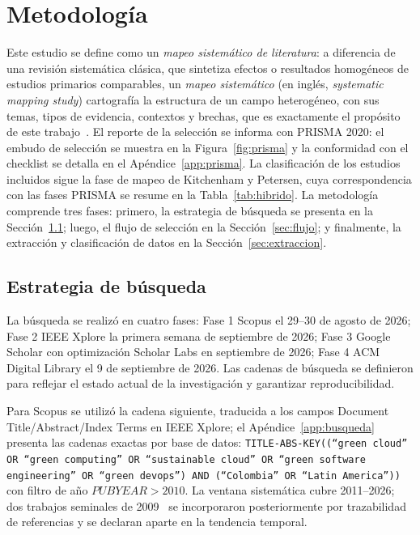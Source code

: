 \documentclass[conference]{IEEEtran}
\begin{document}
\section{Metodolog\'ia}\label{sec:met}
Este estudio se define como un \emph{mapeo sistem\'atico de literatura}: a diferencia de una revisi\'on sistem\'atica cl\'asica, que sintetiza efectos o resultados homog\'eneos de estudios primarios comparables, un \emph{mapeo sistem\'atico} (en ingl\'es, \emph{systematic mapping study}) cartograf\'ia la estructura de un campo heterog\'eneo, con sus temas, tipos de evidencia, contextos y brechas, que es exactamente el prop\'osito de este trabajo~\cite{kitchenham2007,petersen2015}. El reporte de la selecci\'on se informa con PRISMA 2020: el embudo de selecci\'on se muestra en la Figura~\ref{fig:prisma} y la conformidad con el checklist se detalla en el Ap\'endice~\ref{app:prisma}. La clasificaci\'on de los estudios incluidos sigue la fase de mapeo de Kitchenham y Petersen, cuya correspondencia con las fases PRISMA se resume en la Tabla~\ref{tab:hibrido}. La metodolog\'ia comprende tres fases: primero, la estrategia de b\'usqueda se presenta en la Secci\'on~\ref{sec:busqueda}; luego, el flujo de selecci\'on en la Secci\'on~\ref{sec:flujo}; y finalmente, la extracci\'on y clasificaci\'on de datos en la Secci\'on~\ref{sec:extraccion}.

\subsection{Estrategia de b\'usqueda}\label{sec:busqueda}
La b\'usqueda se realiz\'o en cuatro fases: Fase 1 Scopus el 29--30 de agosto de 2026; Fase 2 IEEE Xplore la primera semana de septiembre de 2026; Fase 3 Google Scholar con optimizaci\'on Scholar Labs en septiembre de 2026; Fase 4 ACM Digital Library el 9 de septiembre de 2026. Las cadenas de b\'usqueda se definieron para reflejar el estado actual de la investigaci\'on y garantizar reproducibilidad.

Para Scopus se utiliz\'o la cadena siguiente, traducida a los campos Document Title/Abstract/Index Terms en IEEE Xplore; el Ap\'endice~\ref{app:busqueda} presenta las cadenas exactas por base de datos:
\texttt{TITLE-ABS-KEY((``green cloud'' OR ``green computing'' OR ``sustainable cloud'' OR ``green software engineering'' OR ``green devops'') AND (``Colombia'' OR ``Latin America''))}
con filtro de año $PUBYEAR > 2010$. La ventana sistem\'atica cubre 2011--2026; dos trabajos seminales de 2009~\cite{harmon2009,latif2009} se incorporaron posteriormente por trazabilidad de referencias y se declaran aparte en la tendencia temporal.
\end{document}
